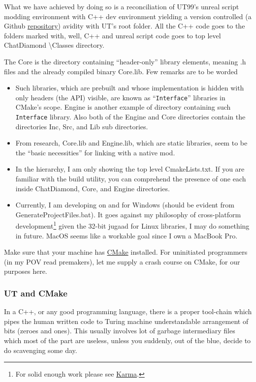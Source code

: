 \documentclass{article}
\theoremstyle{definition}
\newcommand{\FileColor}[1]{{\color{Purple} #1}}
\newcommand{\FolderColor}[1]{{\color{mygray} #1}}
\begin{document}
What we have achieved by doing so is a reconciliation of UT99's unreal script modding environment with C++ dev environment yielding a version controlled  (a Github 
\href{https://github.com/ravimohan1991/ChatDiamond}{repository}) avidity with UT's root folder.  
All the C++ code goes to the folders marked with, well, C++ and unreal script code goes to top level \FolderColor{ChatDiamond \textbackslash Classes} directory.  

The \FolderColor{Core} is the directory containing ``header-only'' library elements, meaning .h files and the already compiled binary \FileColor{Core.lib}.  Few remarks are to be worded
\begin{itemize}
\item Such libraries, which are prebuilt and whose implementation is hidden with only headers (the API) visible, are known as ``\texttt{Interface}'' libraries in CMake's scope.  \FolderColor{Engine} is another example of directory containing such \texttt{Interface} library.  
Also both of the \FolderColor{Engine} and \FolderColor{Core} directories contain the directories \FolderColor{Inc}, \FolderColor{Src}, and \FolderColor{Lib} sub directories. 
\item From research, \FileColor{Core.lib} and \FileColor{Engine.lib}, which are static libraries, seem to be the ``basic necessities'' for linking with a native mod. 
\item In the hierarchy, I am only showing the top level \FileColor{CmakeLists.txt}.  If you are familiar with the build utility, you can comprehend the presence of one each inside \FolderColor{ChatDiamond}, \FolderColor{Core}, and \FolderColor{Engine} directories.
\item Currently, I am developing on and for Windows (should be evident from \FileColor{GenerateProjectFiles.bat}).  It goes against my philosophy of cross-platform development\footnote{For solid enough work please see \href{https://github.com/ravimohan1991/KarmaEngine}{Karma}.} given the 32-bit jugaad for Linux libraries, I may do something in future.  MacOS seems like a workable goal since I own a MacBook Pro.
\end{itemize}  

Make sure that your machine has \href{https://cmake.org/}{CMake} installed.  For uninitiated programmers (in my POV read premakers), let me
supply a crash course on CMake, for our purposes here.

\subsubsection{UT and CMake}
In a C++, or any good programming language, there is a proper tool-chain which pipes the human written code to Turing machine understandable arrangement of bits 
(zeroes and ones).  This usually involves lot of garbage intermediary files which most of the part are useless, unless you suddenly, out of the blue, decide to do 
scavenging some day.
\end{document}
